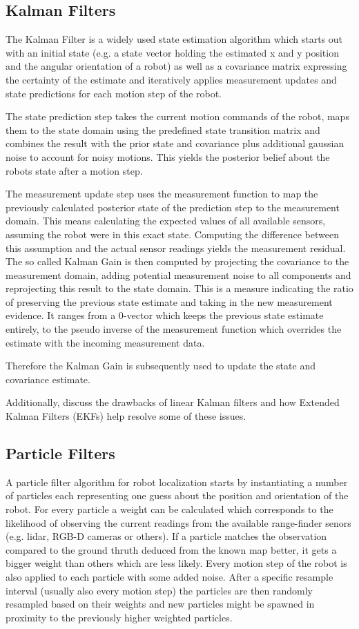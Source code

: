 \documentclass[10pt,journal,compsoc]{IEEEtran}
\begin{document}
\subsection{Kalman Filters}
The Kalman Filter is a widely used state estimation algorithm which starts out with an initial state (e.g. a state vector holding the estimated x and y position and the angular orientation of a robot) as well as a covariance matrix expressing the certainty of the estimate and iteratively applies measurement updates and state predictions for each motion step of the robot.

The state prediction step takes the current motion commands of the robot, maps them to the state domain using the predefined state transition matrix and combines the result with the prior state and covariance plus additional gaussian noise to account for noisy motions. This yields the posterior belief about the robots state after a motion step.

The measurement update step uses the measurement function to map the previously calculated posterior state of the prediction step to the measurement domain. This means calculating the expected values of all available sensors, assuming the robot were in this exact state. Computing the difference between this assumption and the actual sensor readings yields the measurement residual.
The so called Kalman Gain is then computed by projecting the covariance to the measurement domain, adding potential measurement noise to all components and reprojecting this result to the state domain. This is a measure indicating the ratio of preserving the previous state estimate and taking in the new measurement evidence. It ranges from a 0-vector which keeps the previous state estimate entirely, to the pseudo inverse of the measurement function which overrides the estimate with the incoming measurement data.

Therefore the Kalman Gain is subsequently used to update the state and covariance estimate.


Additionally, discuss the drawbacks of linear Kalman filters and how Extended Kalman Filters (EKFs) help resolve some of these issues.



\subsection{Particle Filters}
A particle filter algorithm for robot localization starts by instantiating a number of particles each representing one guess about the position and orientation of the robot. For every particle a weight can be calculated which corresponds to the likelihood of observing the current readings from the available range-finder senors (e.g.  lidar, RGB-D cameras or others). If a particle matches the observation compared to the ground thruth deduced from the known map better, it gets a bigger weight than others which are less likely. Every motion step of the robot is also applied to each particle with some added noise. After a specific resample interval (usually also every motion step) the particles are then randomly resampled based on their weights and new particles might be spawned in proximity to the previously higher weighted particles. 
\end{document}
